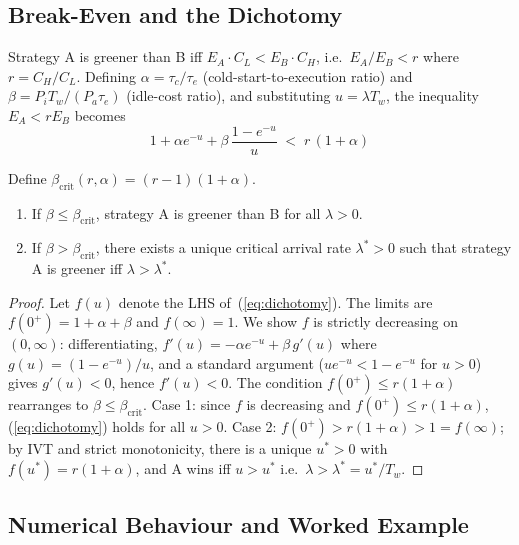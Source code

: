 \subsection{Break-Even and the Dichotomy}
\label{sec:tradeoff:dichotomy}

Strategy A is greener than B iff $E_A \cdot C_L < E_B \cdot C_H$,
i.e.\ $E_A / E_B < r$ where $r = C_H / C_L$. Defining
$\alpha = \tau_c / \tau_e$ (cold-start-to-execution ratio) and
$\beta = P_i T_w / (P_a \tau_e)$ (idle-cost ratio), and substituting
$u = \lambda T_w$, the inequality $E_A < r E_B$ becomes
\begin{equation}
\boxed{\;1 + \alpha e^{-u} + \beta\,\frac{1 - e^{-u}}{u} \;<\; r\,(1+\alpha)\;}
\label{eq:dichotomy}
\end{equation}

\begin{lemma}
\label{lemma:tradeoff}
Define $\beta_{\mathrm{crit}}(r,\alpha) = (r-1)(1+\alpha)$.
\begin{enumerate}
\item If $\beta \le \beta_{\mathrm{crit}}$, strategy A is greener
than B for all $\lambda > 0$.
\item If $\beta > \beta_{\mathrm{crit}}$, there exists a unique
critical arrival rate $\lambda^* > 0$ such that strategy A is greener
iff $\lambda > \lambda^*$.
\end{enumerate}
\end{lemma}

\begin{proof}
Let $f(u)$ denote the LHS of~(\ref{eq:dichotomy}). The limits are
$f(0^+) = 1 + \alpha + \beta$ and $f(\infty) = 1$. We show $f$ is
strictly decreasing on $(0, \infty)$: differentiating,
$f'(u) = -\alpha e^{-u} + \beta\,g'(u)$ where
$g(u) = (1 - e^{-u})/u$, and a standard argument
($u e^{-u} < 1 - e^{-u}$ for $u > 0$) gives $g'(u) < 0$, hence
$f'(u) < 0$. The condition $f(0^+) \le r(1+\alpha)$ rearranges to
$\beta \le \beta_{\mathrm{crit}}$. Case 1: since $f$ is decreasing
and $f(0^+) \le r(1+\alpha)$, (\ref{eq:dichotomy}) holds for all
$u > 0$. Case 2: $f(0^+) > r(1+\alpha) > 1 = f(\infty)$; by IVT and
strict monotonicity, there is a unique $u^* > 0$ with
$f(u^*) = r(1+\alpha)$, and A wins iff $u > u^*$ i.e.\
$\lambda > \lambda^* = u^*/T_w$.
\end{proof}

\subsection{Numerical Behaviour and Worked Example}

